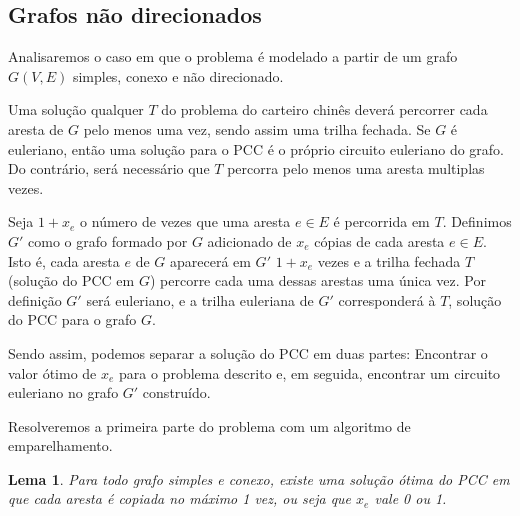 \documentclass[12pt, a4paper]{article}
\newtheorem{lemma}{Lema}
\begin{document}
\subsection{Grafos não direcionados}

Analisaremos o caso em que o problema é modelado a partir de um grafo $G(V, E)$ simples, conexo e não direcionado.

Uma solução qualquer $T$ do problema do carteiro chinês deverá percorrer cada aresta de $G$ pelo menos uma vez, sendo assim uma trilha fechada.
Se $G$ é euleriano, então uma solução para o PCC é o próprio circuito euleriano do grafo.
Do contrário, será necessário que $T$ percorra pelo menos uma aresta multiplas vezes.

Seja $1 + x_e$ o número de vezes que uma aresta $e \in E$ é percorrida em $T$.
Definimos $G'$ como o grafo formado por $G$ adicionado de $x_e$ cópias de cada aresta $e \in E$. 
Isto é, cada aresta $e$ de $G$ aparecerá em $G'$ $1 + x_e$ vezes e a trilha fechada $T$ (solução do PCC em $G$) percorre cada uma dessas arestas uma única vez.
Por definição $G'$ será euleriano, e a trilha euleriana de $G'$ corresponderá à $T$, solução do PCC para o grafo $G$.

Sendo assim, podemos separar a solução do PCC em duas partes: Encontrar o valor ótimo de $x_e$ para o problema descrito e, em seguida, encontrar um circuito euleriano no grafo $G'$ construído.

Resolveremos a primeira parte do problema com um algoritmo de emparelhamento.



\begin{lemma} 
    \label{lemma-pcc}
    Para todo grafo simples e conexo, existe uma solução ótima do PCC em que cada aresta é copiada no máximo 1 vez, ou seja que $x_e$ vale 0 ou 1. 
\end{lemma}
\end{document}

